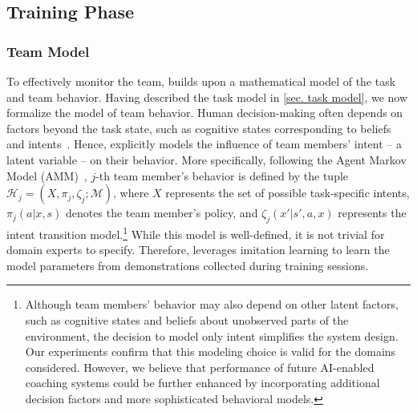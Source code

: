 \subsection{Training Phase}
\label{sec. tic training}

\subsubsection{Team Model}
\label{sec. teamwork model}
To effectively monitor the team, \coach builds upon a mathematical model of the task and team behavior. Having described the task model in \cref{sec. task model}, we now formalize the model of team behavior. Human decision-making often depends on factors beyond the task state, such as cognitive states corresponding to beliefs and intents~\cite{hiatt2017human, neubauer2020multimodal}. Hence, \coach explicitly models the influence of team members' intent -- a latent variable -- on their behavior. More specifically, following the Agent Markov Model (AMM)~\cite{unhelkar2019learning}, $j$-th team member's behavior is defined by the tuple $\mathcal{H}_j = (X, \pi_j, \zeta_j; \mathcal{M})$, where $X$ represents the set of possible task-specific intents, $\pi_j(a|x, s)$ denotes the team member's policy, and $\zeta_j(x'|s', a, x)$ represents the intent transition model.\footnote{%
Although team members' behavior may also depend on other latent factors, such as cognitive states and beliefs about unobserved parts of the environment, the decision to model only intent simplifies the system design. Our experiments confirm that this modeling choice is valid for the domains considered. However, we believe that performance of future AI-enabled coaching systems could be further enhanced by incorporating additional decision factors and more sophisticated behavioral models.}
While this model is well-defined, it is not trivial for domain experts to specify. Therefore, \coach leverages imitation learning to learn the model parameters from demonstrations collected during training sessions.

